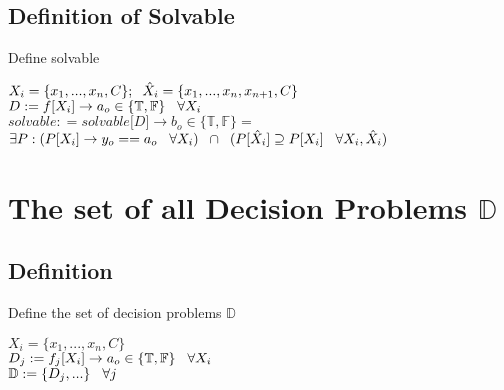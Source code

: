 \documentclass[11pt]{article}
\begin{document}
\subsection{Definition of Solvable}
Define solvable
\begin{center}
$
X_i = \{x_1,...,x_n,C\}; \hspace{2mm} \hat{X}_i = \{x_1,...,x_n,x_{n+1},C\}
$
\\ \vspace{2mm}
$
D := f \lbrack X_i \rbrack \rightarrow a_{o} \in \{\mathbb{T}, \mathbb{F}\} \hspace{3mm} \forall X_i
$
\\ \vspace{2mm}
$solvable : = solvable \lbrack D \rbrack \rightarrow b_o \in \{ \mathbb{T}, \mathbb{F} \} =$
\\ \vspace{2mm}
$\exists P : (P \lbrack X_i \rbrack \rightarrow y_{o} == a_{o} \hspace{3mm} \forall X_i) \hspace{2mm} \cap \hspace{2mm} (P[\hat{X}_i] \supseteq P[X_i] \hspace{3mm} \forall X_i,\hat{X}_i)
$
\end{center}





\section{The set of all Decision Problems $\mathbb{D}$}

\subsection{Definition}
Define the set of decision problems $\mathbb{D}$
\begin{center}
$
X_i = \{x_1,...,x_n,C\}
$
\\ \vspace{2mm}
$
D_j := f_j \lbrack X_i \rbrack \rightarrow a_{o} \in \{\mathbb{T}, \mathbb{F}\} \hspace{3mm} \forall X_i
$
\\ \vspace{2mm}
$\mathbb{D} := \{D_j,...\} \hspace{3mm} \forall j$
\end{center}
\end{document}
